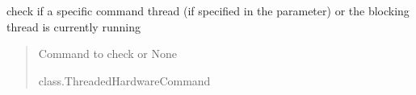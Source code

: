 \documentclass[letterpaper,10pt,english]{sphinxmanual}
\begin{document}
\begin{fulllineitems}
\label{\detokenize{webserverdocs:HardwareThreadedClass.IsCompletedCommand}}
\pysigstartsignatures
{}
\pysigstopsignatures
\sphinxAtStartPar
check if a specific command thread (if specified in the parameter)
or the blocking thread is currently running

\begin{fulllineitems}
\label{\detokenize{webserverdocs:HardwareThreadedClass.IsCompletedCommand.do}}
\pysigstartsignatures
{}
\pysigstopsignatures\begin{quote}\begin{description}
\sphinxAtStartPar
Command to check or None

\sphinxAtStartPar
class.ThreadedHardwareCommand

\end{description}\end{quote}

\end{fulllineitems}


\end{fulllineitems}

\end{document}
